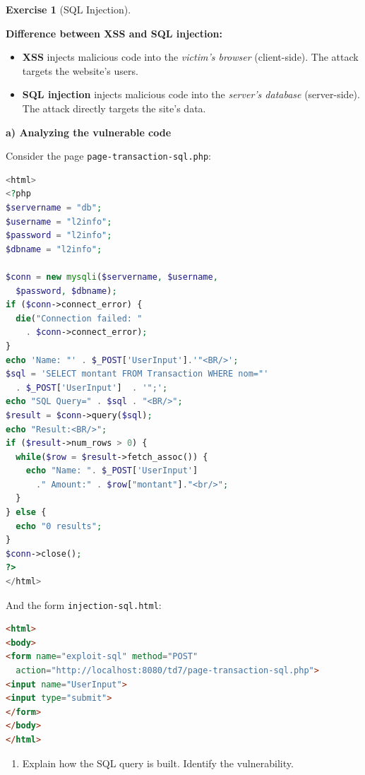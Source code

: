 \documentclass[a4paper,11pt]{article}
\theoremstyle{plain}
\theoremstyle{definition}
\newtheorem{exercice}{Exercise}
\begin{document}
\begin{exercice}[SQL Injection]

\begin{rappel}
\textbf{Difference between XSS and SQL injection:}
\begin{itemize}
    \item \textbf{XSS} injects malicious code into the \textit{victim's browser} (client-side). The attack targets the website's users.
    \item \textbf{SQL injection} injects malicious code into the \textit{server's database} (server-side). The attack directly targets the site's data.
\end{itemize}
\end{rappel}

\medskip

\textbf{a) Analyzing the vulnerable code}

\medskip

Consider the page \texttt{page-transaction-sql.php}:

\begin{lstlisting}[language=PHP]
<html>
<?php
$servername = "db";
$username = "l2info";
$password = "l2info";
$dbname = "l2info";

$conn = new mysqli($servername, $username,
  $password, $dbname);
if ($conn->connect_error) {
  die("Connection failed: "
    . $conn->connect_error);
}
echo 'Name: "' . $_POST['UserInput'].'"<BR/>';
$sql = 'SELECT montant FROM Transaction WHERE nom="'
  . $_POST['UserInput']  . '";';
echo "SQL Query=" . $sql . "<BR/>";
$result = $conn->query($sql);
echo "Result:<BR/>";
if ($result->num_rows > 0) {
  while($row = $result->fetch_assoc()) {
    echo "Name: ". $_POST['UserInput']
      ." Amount:" . $row["montant"]."<br/>";
  }
} else {
  echo "0 results";
}
$conn->close();
?>
</html>
\end{lstlisting}

And the form \texttt{injection-sql.html}:

\begin{lstlisting}[language=HTML]
<html>
<body>
<form name="exploit-sql" method="POST"
  action="http://localhost:8080/td7/page-transaction-sql.php">
<input name="UserInput">
<input type="submit">
</form>
</body>
</html>
\end{lstlisting}

\begin{enumerate}
    \item Explain how the SQL query is built. Identify the vulnerability.
\end{enumerate}


\end{exercice}
\end{document}
